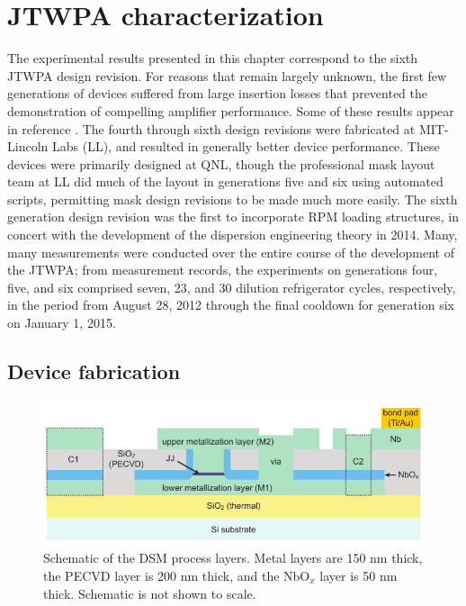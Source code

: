 
\chapter{JTWPA characterization}
\label{c:twpa_exp}

The experimental results presented in this chapter correspond to the sixth JTWPA design revision.  For reasons that remain largely unknown, the first few generations of devices suffered from large insertion losses that prevented the demonstration of compelling amplifier performance.  Some of these results appear in reference \cite{slichterthesis}.  The fourth through sixth design revisions were fabricated at MIT-Lincoln Labs (LL), and resulted in generally better device performance.  These devices were primarily designed at QNL, though the professional mask layout team at LL did much of the layout in generations five and six using automated scripts, permitting mask design revisions to be made much more easily.  The sixth generation design revision was the first to incorporate RPM loading structures, in concert with the development of the dispersion engineering theory in 2014.  Many, many measurements were conducted over the entire course of the development of the JTWPA; from measurement records, the experiments on generations four, five, and six comprised seven, 23, and 30 dilution refrigerator cycles, respectively, in the period from August 28, 2012 through the final cooldown for generation six on January 1, 2015.

\section{Device fabrication}\label{s:twpa_fab}

\begin{figure}
\begin{center}
\includegraphics[width=5in]{twpa_exp/DSM_stackup.pdf}
\end{center}
\caption[Deep submicron process layers]{Schematic of the DSM process layers.  Metal layers are 150 nm thick, the PECVD layer is 200 nm thick, and the NbO$_x$ layer is 50 nm thick.  Schematic is not shown to scale.}
\label{fig:DSM_stackup}
\end{figure}

